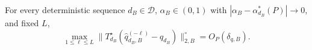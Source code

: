 For every deterministic sequence \(d_B\in\mathcal D\), \(\alpha_B\in(0,1)\) with \(|\alpha_B-\alpha_{d_B}^*(P)|\to0\), and fixed \(L\),
\[
\max_{1\le\ell\le L}\|T_{d_B}^{\star}(\widehat q_{d_B,B}^{(-\ell)}-q_{d_B})\|_{2,B}^{\circ}=O_P(\delta_{q,B}).
\]